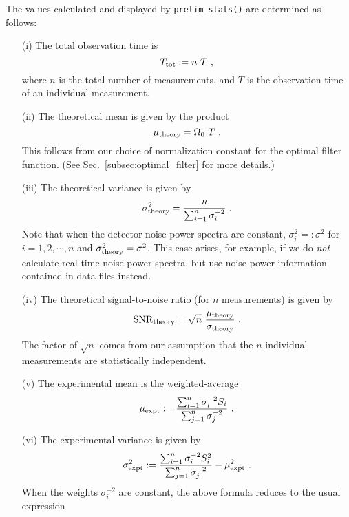The values calculated and displayed by {\tt prelim\_stats()} are 
determined as follows:
%
\begin{itemize}
\item[(i)] The total observation time is
%
\begin{equation}
T_{\rm tot}:=n\ T\ ,
\end{equation}
%
where $n$ is the total number of measurements, and $T$ is the 
observation time of an individual measurement.
%
\item[(ii)] The theoretical mean is given by the product
%
\begin{equation}
\mu_{\rm theory}=\Omega_0\ T\ .
\end{equation}
%
This follows from our choice of normalization constant for the optimal
filter function.
(See Sec.~\ref{subsec:optimal_filter} for more details.)
%
\item[(iii)] The theoretical variance is given by
%
\begin{equation}
\sigma^2_{\rm theory}={n\over \sum_{i=1}^n\sigma_i^{-2}}\ .
\end{equation}
%
Note that when the detector noise power spectra are constant, 
$\sigma^2_i=:\sigma^2$ for $i=1,2,\cdots,n$ and 
$\sigma^2_{\rm theory}=\sigma^2$.
This case arises, for example, if we do {\it not} calculate real-time 
noise power spectra, but use noise power information contained in 
data files instead.
%
\item[(iv)] The theoretical signal-to-noise ratio (for $n$ 
measurements) is given by
%
\begin{equation}
{\rm SNR}_{\rm theory}=\sqrt{n}\ {\mu_{\rm theory}\over\sigma_{\rm
theory}}\ .
\end{equation}
%
The factor of $\sqrt n$ comes from our assumption that the $n$
individual measurements are statistically independent.
%
\item[(v)] The experimental mean is the weighted-average 
%
\begin{equation}
\mu_{\rm expt}:={\sum_{i=1}^n\sigma_i^{-2}S_i\over
\sum_{j=1}^n \sigma_j^{-2}}\ .
\end{equation}
%
\item[(vi)] The experimental variance is given by
%
\begin{equation}
\sigma^2_{\rm expt}:={\sum_{i=1}^n\sigma_i^{-2}S_i^2\over
\sum_{j=1}^n \sigma_j^{-2}}-\mu_{\rm expt}^2\ .
\end{equation}
%
When the weights $\sigma_i^{-2}$ are constant, the above formula
reduces to the usual expression 
%
\begin{equation}

\end{equation}
\end{itemize}
